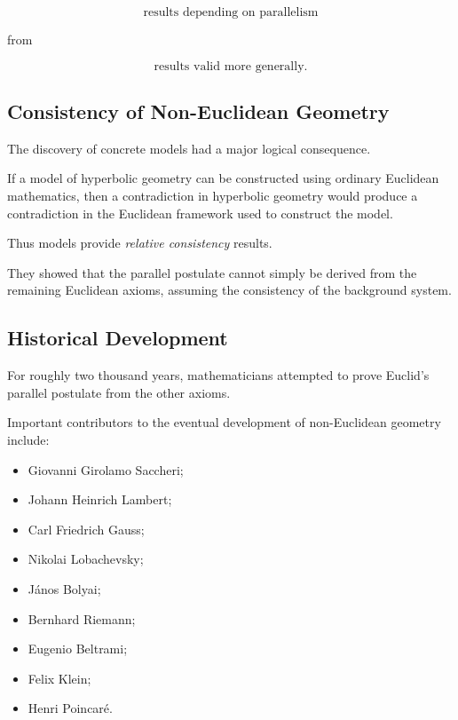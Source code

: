 \[
\boxed{
\text{results depending on parallelism}
}
\]

from

\[
\boxed{
\text{results valid more generally}.
}
\]

\subsection{Consistency of Non-Euclidean Geometry}
\label{subsec:consistency-non-euclidean}

The discovery of concrete models had a major logical consequence.

If a model of hyperbolic geometry can be constructed using ordinary
Euclidean mathematics, then a contradiction in hyperbolic geometry would
produce a contradiction in the Euclidean framework used to construct the
model.

Thus models provide \emph{relative consistency} results.

They showed that the parallel postulate cannot simply be derived from the
remaining Euclidean axioms, assuming the consistency of the background
system.

\subsection{Historical Development}
\label{subsec:non-euclidean-history}

For roughly two thousand years, mathematicians attempted to prove Euclid's
parallel postulate from the other axioms.

Important contributors to the eventual development of non-Euclidean geometry
include:

\begin{itemize}
    \item Giovanni Girolamo Saccheri;
    \item Johann Heinrich Lambert;
    \item Carl Friedrich Gauss;
    \item Nikolai Lobachevsky;
    \item J\'anos Bolyai;
    \item Bernhard Riemann;
    \item Eugenio Beltrami;
    \item Felix Klein;
    \item Henri Poincar\'e.
\end{itemize}

